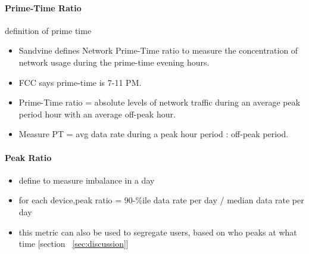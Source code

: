\paragraph{Prime-Time Ratio} definition of prime time
\begin{itemize}
\itemsep0em 
\item Sandvine defines Network Prime-Time ratio to measure the concentration of network usage during the prime-time evening hours.
\item FCC says prime-time is 7-11 PM.
\item Prime-Time ratio = absolute levels of network traffic during an average peak period hour with an average off-peak hour.
\item Measure PT = avg data rate during a peak hour period : off-peak period.
\end{itemize}


\paragraph{Peak Ratio}
\begin{itemize}
\itemsep0em
\item define to measure imbalance in a day
\item for each device,peak ratio  =    90-\%ile data rate per day / median data rate per day
\item this metric can also be used to segregate users, based on who peaks at what time [section ~\ref{sec:discussion}]
\end{itemize}

